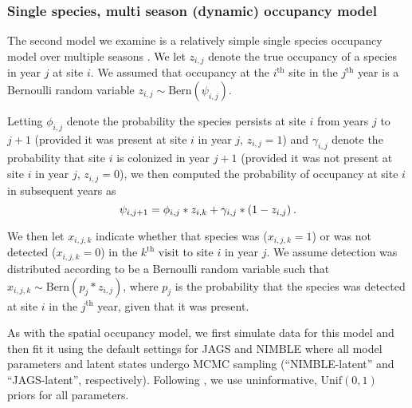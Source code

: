 \documentclass[12pt]{article}
\begin{document}
\subsubsection*{Single species, multi season (dynamic) occupancy
  model}
\label{sec:ssms}

The second model we examine is a relatively simple single species
occupancy model over multiple seasons \citep{Royle2007}. We let
$z_{i,j}$ denote the true occupancy of a species in year $j$ at site
$i$.  We assumed that occupancy at the $i^{\mathrm{th}}$ site in the
$j^{\mathrm{th}}$ year is a Bernoulli random variable $z_{i,j} \sim
\mathrm{Bern}(\psi_{i,j})$.

Letting $\phi_{i,j}$ denote the probability the species persists at
site $i$ from years $j$ to $j+1$ (provided it was present at site $i$
in year $j$, $z_{i,j}=1$) and $\gamma_{i,j}$ denote the probability
that site $i$ is colonized in year $j+1$ (provided it was not present
at site $i$ in year $j$, $z_{i,j}=0$), we then computed the
probability of occupancy at site $i$ in subsequent years as
%
\begin{equation}
  \label{eq:mutliseason}
  \psi_{i,j+1} =
  \phi_{i,j} * z_{i,k} + \gamma_{i,j} * (1-z_{i,j})\hspace{0.2em}.
\end{equation}
%

We then let $x_{i,j,k}$ indicate whether that species was
($x_{i,j,k}=1$) or was not detected ($x_{i,j,k}=0$) in the
$k^{\mathrm{th}}$ visit to site $i$ in year $j$. We assume detection
was distributed according to be a Bernoulli random variable such that
$x_{i,j,k} \sim \mathrm{Bern}(p_{j}*z_{i,j})$, where $p_{j}$ is the
probability that the species was detected at site $i$ in the
$j^{\mathrm{th}}$ year, given that it was present.

As with the spatial occupancy model, we first simulate data for this
model and then fit it using the default settings for JAGS and NIMBLE
where all model parameters and latent states undergo MCMC sampling
(``NIMBLE-latent'' and ``JAGS-latent'', respectively). Following
\cite{Royle2007, kery-schaub-11}, we use uninformative,
$\mathrm{Unif}(0,1)$ priors for all parameters.
\end{document}
